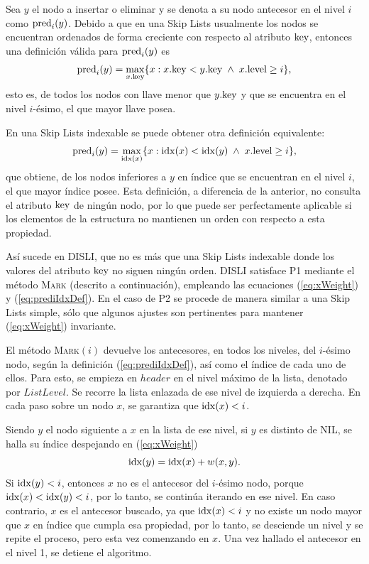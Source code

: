 \documentclass[a4paper,10pt,twocolumn]{article}
\newcommand{\pred}[1]{{\rm pred}_{#1}} %
\newcommand{\predi}{\pred{i}} %
\newcommand{\idx}{{\rm idx}}
\newcommand{\key}{{\rm key}}
\newcommand{\lev}{{\rm level}}
\begin{document}
  Sea $ y $ el nodo a insertar o eliminar y se denota a su nodo antecesor en el nivel $ i $ como $ \predi(y) $. Debido a que en una Skip Lists usualmente los nodos se encuentran ordenados de forma creciente con respecto al atributo $ \key $, entonces una definición válida para 
  $ \predi(y) $ es
  \begin{equation}\label{eq:prediKeyDef}
	  \predi(y) = \underset{x . \key}{\max} \{ x : x . \key < y . \key \; \wedge \; x . \lev \geq i\} ,
  \end{equation}
  esto es, de todos los nodos con llave menor que $ y . \key $ y que se encuentra en el nivel $ i $-ésimo, el que mayor llave posea.
  
  En una Skip Lists indexable se puede obtener otra definición equivalente:
  \begin{equation}\label{eq:prediIdxDef}
	  \predi(y) = \underset{\idx(x)}{\max} \{ x : \idx(x) < \idx(y) \; \wedge \; x . \lev \geq i \} ,
  \end{equation}
  que obtiene, de los nodos inferiores a $ y $ en índice que se encuentran en el nivel $ i $, el que mayor índice posee. Esta definición, a diferencia de la anterior, no consulta el atributo $ \key $ de ningún nodo, por lo que puede ser perfectamente aplicable si los elementos de la estructura no mantienen un orden con respecto a esta propiedad.
  
  Así sucede en DISLI, que no es más que una Skip Lists indexable donde los valores del atributo $ \key $ no siguen ningún orden. DISLI satisface P1 mediante el método \textsc{Mark} (descrito a continuación), empleando las ecuaciones (\ref{eq:xWeight}) y (\ref{eq:prediIdxDef}). En el caso de P2 se procede de manera similar a una Skip Lists simple, sólo que algunos ajustes son pertinentes para mantener (\ref{eq:xWeight}) invariante.
  
  El método \textsc{Mark}$ (i) $ devuelve los antecesores, en todos los niveles, del $ i $-ésimo nodo, según la definición (\ref{eq:prediIdxDef}), así como el índice de cada uno de ellos. Para esto, se empieza en $ header $ en el nivel máximo de la lista, denotado por $ ListLevel $. Se recorre la lista enlazada de ese nivel de izquierda a derecha. En cada paso sobre un nodo $ x $, se garantiza que $ \idx(x) < i $. 
  
  Siendo $ y $ el nodo siguiente a $ x $ en la lista de ese nivel, si $ y $ es distinto de NIL, se halla su índice despejando en (\ref{eq:xWeight})
  \[ \idx(y) = \idx(x) + w(x, y). \]
  Si $ \idx(y) < i $, entonces $ x $ no es el antecesor del $ i $-ésimo nodo, porque $ \idx(x) < \idx(y) < i $, por lo tanto, se continúa iterando en ese nivel. En caso contrario, $ x $ es el antecesor buscado, ya que $ \idx(x) < i $ y no existe un nodo mayor que $ x $ en índice que cumpla esa propiedad, por lo tanto, se desciende un nivel y se repite el proceso, pero esta vez comenzando en $ x $. Una vez hallado el antecesor en el nivel 1, se detiene el algoritmo.
  
\end{document}
